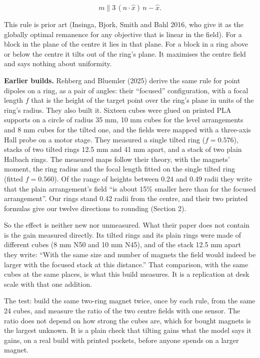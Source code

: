 \documentclass[11pt,a4paper]{article}
\begin{document}
\begin{equation*}
m \parallel 3\,(n\cdot\hat x)\,n-\hat x .
\end{equation*}


This rule is prior art (Insinga, Bjork, Smith and Bahl 2016, who give it as the globally optimal remanence for any objective that is linear in the field). For a block in the plane of the centre it lies in that plane. For a block in a ring above or below the centre it tilts out of the ring's plane. It maximises the centre field and says nothing about uniformity.

{\bfseries\boldmath Earlier builds.} Rehberg and Bluemler (2025) derive the same rule for point dipoles on a ring, as a pair of angles: their ``focused'' configuration, with a focal length $f$ that is the height of the target point over the ring's plane in units of the ring's radius. They also built it. Sixteen cubes were glued on printed PLA supports on a circle of radius 35 mm, 10 mm cubes for the level arrangements and 8 mm cubes for the tilted one, and the fields were mapped with a three-axis Hall probe on a motor stage. They measured a single tilted ring ($f=0.576$), stacks of two tilted rings 12.5 mm and 41 mm apart, and a stack of two plain Halbach rings. The measured maps follow their theory, with the magnets' moment, the ring radius and the focal length fitted on the single tilted ring (fitted $f=0.560$). Of the range of heights between 0.24 and 0.49 radii they write that the plain arrangement's field ``is about 15\% smaller here than for the focused arrangement''. Our rings stand 0.42 radii from the centre, and their two printed formulas give our twelve directions to rounding (Section 2).

So the effect is neither new nor unmeasured. What their paper does not contain is the gain measured directly. Its tilted rings and its plain rings were made of different cubes (8 mm N50 and 10 mm N45), and of the stack 12.5 mm apart they write: ``With the same size and number of magnets the field would indeed be larger with the focused stack at this distance.'' That comparison, with the same cubes at the same places, is what this build measures. It is a replication at desk scale with that one addition.

The test: build the same two-ring magnet twice, once by each rule, from the same 24 cubes, and measure the ratio of the two centre fields with one sensor. The ratio does not depend on how strong the cubes are, which for bought magnets is the largest unknown. It is a plain check that tilting gains what the model says it gains, on a real build with printed pockets, before anyone spends on a larger magnet.
\end{document}
